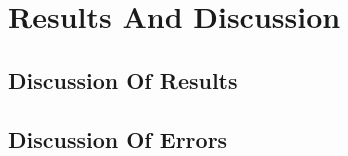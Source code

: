 \section{Results And Discussion}

	\subsection{Discussion Of Results}
	
	\subsection{Discussion Of Errors}